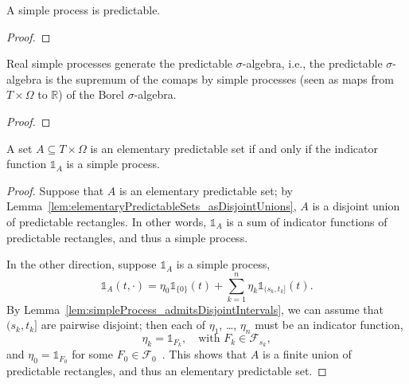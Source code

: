 \begin{lemma}\label{lem:predictable_simpleProcess}
  \leanok
A simple process is predictable.
\end{lemma}

\begin{proof}
  \leanok
\end{proof}


\begin{lemma}\label{lem:iSup_comap_simpleProcess}
  \leanok
Real simple processes generate the predictable $\sigma$-algebra, i.e., the predictable $\sigma$-algebra is the supremum of the comaps by simple processes (seen as maps from $T \times \Omega$ to $\mathbb{R}$) of the Borel $\sigma$-algebra.
\end{lemma}

\begin{proof}
  \leanok
\end{proof}


\begin{lemma}\label{lem:elementaryPredictableSet_iff_indicator}
  \leanok
A set $A \subseteq T \times \Omega$ is an elementary predictable set if and only if the indicator function $\mathbb{1}_A$ is a simple process.
\end{lemma}

\begin{proof}
  Suppose that $A$ is an elementary predictable set;
  by Lemma~\ref{lem:elementaryPredictableSets_asDisjointUnions},
  $A$ is a disjoint union of predictable rectangles.
  In other words, $\mathbb{1}_A$
  is a sum of indicator functions of predictable rectangles, and thus a simple process.

  In the other direction, suppose $\mathbb{1}_A$ is a simple process,
  \[
  \mathbb{1}_A(t,\cdot) = \eta_0 \mathbb{1}_{\{0\}}(t) + \sum_{k=1}^{n} \eta_k \mathbb{1}_{(s_k, t_k]}(t).
  \]
  By Lemma~\ref{lem:simpleProcess_admitsDisjointIntervals},
  we can assume that $(s_k, t_k]$ are pairwise disjoint;
  then each of $\eta_1$, \dots, $\eta_n$ must be an indicator function,
  \[
  \eta_k = \mathbb{1}_{F_k}, \quad\text{with } F_k \in \mathcal{F}_{s_k},
  \]
  and $\eta_0 = \mathbb{1}_{F_0}$ for some $F_0 \in \mathcal{F}_0$~.
  This shows that $A$ is a finite union of predictable rectangles, and thus an elementary predictable set.
\end{proof}



